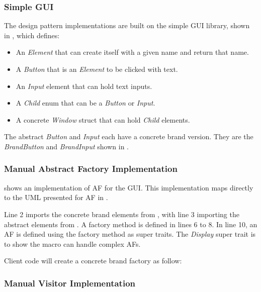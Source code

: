 \subsubsection{Simple GUI}
The design pattern implementations are built on the simple GUI library, shown in , which defines:

\begin{itemize}
	\item An \textit{Element} that can create itself with a given name and return that name.
	\item A \textit{Button} that is an \textit{Element} to be clicked with text.
	\item An \textit{Input} element that can hold text inputs.
	\item A \textit{Child} enum that can be a \textit{Button} or \textit{Input}.
	\item A concrete \textit{Window} struct that can hold \textit{Child} elements.
\end{itemize}

The abstract \textit{Button} and \textit{Input} each have a concrete brand version.
They are the \textit{BrandButton} and \textit{BrandInput} shown in .

\subsubsection{Manual Abstract Factory Implementation}
 shows an implementation of AF for the GUI.
This implementation maps directly to the UML presented for AF in .

Line 2 imports the concrete brand elements from , with line 3 importing the abstract elements from .
A factory method is defined in lines 6 to 8.
In line 10, an AF is defined using the factory method as super traits.
The \textit{Display} super trait is to show the macro can handle complex AFs.

Client code will create a concrete brand factory as follow:


\subsubsection{Manual Visitor Implementation}
\label{sec:visitor-manual-implementation}

